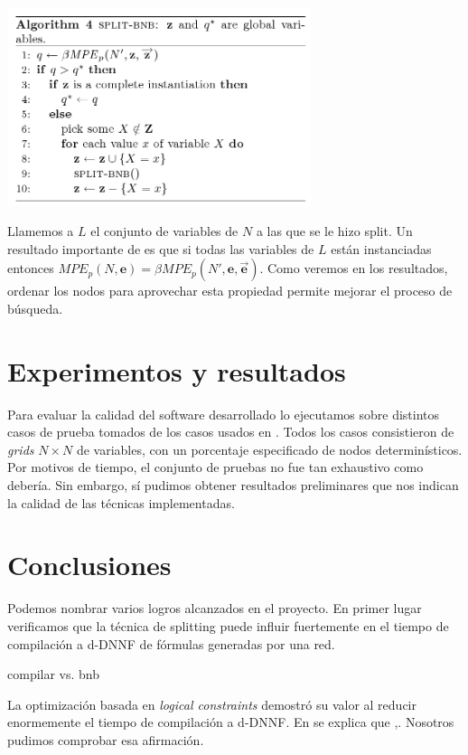 \documentclass[11pt, letterpaper]{article}
\begin{document}
\begin{center}
\includegraphics[width=24em]{splitbnb.png}\\
\end{center}

Llamemos a $L$ el conjunto de variables de $N$ a las que se le hizo
split. Un resultado importante de \cite{ChoiChaviraDarwiche07} es que
si todas las variables de $L$ están instanciadas entonces $MPE_p(N,
\mathbf{e}) = \beta MPE_p(N', \mathbf{e}, \vec{\mathbf{e}})$.
Como veremos en los resultados, ordenar los nodos para aprovechar esta propiedad
permite mejorar el proceso de búsqueda.

\section{Experimentos y resultados}

Para evaluar la calidad del software desarrollado lo ejecutamos sobre distintos
casos de prueba tomados de los casos usados en \cite{sangbeamekautzAAAI05}.
Todos los casos consistieron de \emph{grids} $N \times N$ de variables, con un
porcentaje especificado de nodos determinísticos. Por motivos de tiempo, el
conjunto de pruebas no fue tan exhaustivo como debería. Sin embargo, sí pudimos
obtener resultados preliminares que nos indican la calidad de las técnicas
implementadas.

\section{Conclusiones}

Podemos nombrar varios logros alcanzados en el proyecto. En primer lugar
verificamos que la técnica de splitting puede influir fuertemente en el tiempo
de compilación a d-DNNF de fórmulas generadas por una red.

compilar vs. bnb

La optimización basada en \emph{logical constraints} demostró su valor al
reducir enormemente el tiempo de compilación a d-DNNF. En
\cite{Darwiche01alogical} se explica que ,. Nosotros pudimos comprobar esa
afirmación.
\end{document}
